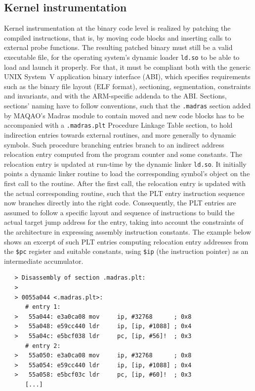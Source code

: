 \documentclass[11pt, a4paper, twoside]{montblanc2}
\begin{document}
\subsection{Kernel instrumentation}

Kernel instrumentation at the binary code level is realized by patching the 
compiled instructions, that is, by moving code blocks and inserting calls to 
external probe functions. The resulting patched binary must still be a valid 
executable file, for the operating system's dynamic loader \verb|ld.so| to be 
able to load and launch it properly. For that, it must be compliant both with 
the generic UNIX System~V application binary interface (ABI), which specifies 
requirements such as the binary file layout (ELF format), sectioning, 
segmentation, constraints and invariants, and with the ARM-specific addenda to 
the ABI. Sections, sections' naming have to follow conventions, such that the 
\verb|.madras| section added by MAQAO's Madras module to contain moved and new 
code blocks has to be accompanied with a \verb|.madras.plt| Procedure Linkage 
Table section, to hold indirection entries towards external routines, and more generally 
to dynamic symbols. Such procedure branching entries branch to an indirect 
address relocation entry computed from the program counter and some constants. 
The relocation entry is updated at run-time by the dynamic linker \verb|ld.so|. 
It initially points a dynamic linker routine to load the corresponding symbol's 
object on the first call to the routine. After the first call, the relocation 
entry is updated with the actual corresponding routine, such that the PLT entry 
instruction sequence now branches directly into the right code. Consequently, 
the PLT entries
are assumed to follow a specific layout and sequence of instructions to build 
the actual target jump address for the entry, taking into account the 
constraints of the architecture in expressing assembly instruction constants. 
The example below shows an excerpt of such PLT entries computing relocation 
entry addresses from the \verb|$pc| register and suitable constants, using 
\verb|$ip| (the instruction pointer) as an intermediate accumulator.

\begin{footnotesize}
\begin{verbatim}
   > Disassembly of section .madras.plt:
   >
   > 0055a044 <.madras.plt>:
      # entry 1:
   >   55a044: e3a0ca08 mov     ip, #32768      ; 0x8
   >   55a048: e59cc440 ldr     ip, [ip, #1088] ; 0x4
   >   55a04c: e5bcf038 ldr     pc, [ip, #56]!  ; 0x3
      # entry 2:
   >   55a050: e3a0ca08 mov     ip, #32768      ; 0x8
   >   55a054: e59cc440 ldr     ip, [ip, #1088] ; 0x4
   >   55a058: e5bcf03c ldr     pc, [ip, #60]!  ; 0x3
      [...]
\end{verbatim}
\end{footnotesize}
\end{document}
